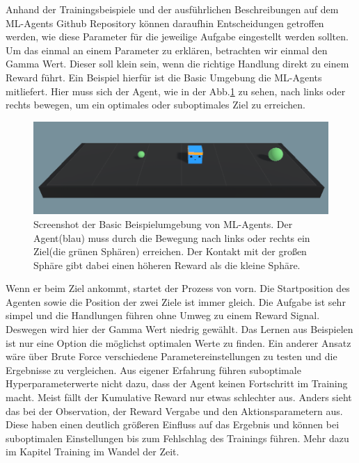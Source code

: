 \noindent Anhand der Trainingsbeispiele und der ausführlichen Beschreibungen auf dem ML-Agents Github Repository\cite{config_ppo} können daraufhin Entscheidungen getroffen werden, wie diese Parameter für die jeweilige Aufgabe eingestellt werden sollten. Um das einmal an einem Parameter zu erklären, betrachten wir einmal den Gamma Wert. Dieser soll klein sein, wenn die richtige Handlung direkt zu einem Reward führt. Ein Beispiel hierfür ist die Basic Umgebung die ML-Agents mitliefert. Hier muss sich der Agent, wie in der Abb.\ref{fig:basic_example} zu sehen, nach links oder rechts bewegen, um ein optimales oder suboptimales Ziel zu erreichen. 
\begin{figure} [ht]
	\centering
	\includegraphics[width=\linewidth,height=\textheight,keepaspectratio]{img/basic_example_environment}
	\caption[Basic Umgebungsbeispiel von ML-Agents]{Screenshot der Basic Beispielumgebung von ML-Agents. Der Agent(blau) muss durch die Bewegung nach links oder rechts ein Ziel(die grünen Sphären) erreichen. Der Kontakt mit der großen Sphäre gibt dabei einen höheren Reward als die kleine Sphäre.}
	\label{fig:basic_example}
\end{figure}
Wenn er beim Ziel ankommt, startet der Prozess von vorn. Die Startposition des Agenten sowie die Position der zwei Ziele ist immer gleich. Die Aufgabe ist sehr simpel und die Handlungen führen ohne Umweg zu einem Reward Signal. Deswegen wird hier der Gamma Wert niedrig gewählt. Das Lernen aus Beispielen ist nur eine Option die möglichst optimalen Werte zu finden. Ein anderer Ansatz wäre über Brute Force verschiedene Parametereinstellungen zu testen und die Ergebnisse zu vergleichen. Aus eigener Erfahrung führen suboptimale Hyperparameterwerte nicht dazu, dass der Agent keinen Fortschritt im Training macht. Meist fällt der Kumulative Reward nur etwas schlechter aus. Anders sieht das bei der Observation, der Reward Vergabe und den Aktionsparametern aus. Diese haben einen deutlich größeren Einfluss auf das Ergebnis und können bei suboptimalen Einstellungen bis zum Fehlschlag des Trainings führen. Mehr dazu im Kapitel Training im Wandel der Zeit.


